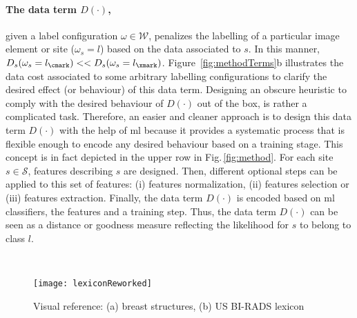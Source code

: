 \paragraph{The data term $D(\cdot)$,} \label{sec:method:dataTerm}
given a label configuration $\omega \in \mathcal{W}$, penalizes the labelling of a particular image element or site ($\omega_s = l$) based on the data associated to $s$.
In this manner, $D_s(\omega_s=l_\cmark) << D_s(\omega_s=l_\xmark)$.
Figure~\ref{fig:methodTerms}b illustrates the data cost associated to some arbitrary labelling configurations to clarify the desired effect (or behaviour) of this data term.
Designing an obscure heuristic to comply with the desired behaviour of $D(\cdot)$ out of the box, is rather a complicated task.
Therefore, an easier and cleaner approach is to design this data term $D(\cdot)$ with the help of \ac{ml} because it provides a systematic process that is flexible enough to encode any desired behaviour based on a training stage.
This concept is in fact depicted in the upper row in Fig.\,\ref{fig:method}.
For each site $s \in \mathcal{S}$, features describing $s$ are designed. Then, different optional steps can be applied to this set of features: (i) features normalization, (ii) features selection or (iii) features extraction. Finally, the data term $D(\cdot)$ is encoded based on \ac{ml} classifiers, the features and a training step.
Thus, the data term $D(\cdot)$ can be seen as a distance or goodness measure reflecting the likelihood for $s$ to belong to class $l$.


\begin{figure*}[!htb]
    \centering
    \begin{subfloat}
        \centering
        \label{fig:features:breast}
    \end{subfloat}
    ~~~
    \begin{subfloat}
        \centering
        \texttt{[image: lexiconReworked]}
        \label{fig:features:lexicon}
    \end{subfloat}
    \caption {{\footnotesize Visual reference: (a) breast structures, (b) US BI-RADS lexicon}}
    \label{fig:features}
\end{figure*}

